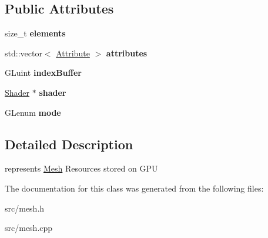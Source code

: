 \subsection*{Public Attributes}
\begin{DoxyCompactItemize}
\item 
\hypertarget{class_mesh_data_a1fe829b1f1fbc268824cbdf883a78093}{}size\+\_\+t {\bfseries elements}\label{class_mesh_data_a1fe829b1f1fbc268824cbdf883a78093}

\item 
\hypertarget{class_mesh_data_a78e8a966051cd6c5c0460074cac8fd89}{}std\+::vector$<$ \hyperlink{class_attribute}{Attribute} $>$ {\bfseries attributes}\label{class_mesh_data_a78e8a966051cd6c5c0460074cac8fd89}

\item 
\hypertarget{class_mesh_data_a99f16e148d7e476a6bfad9b8b12c9c75}{}G\+Luint {\bfseries index\+Buffer}\label{class_mesh_data_a99f16e148d7e476a6bfad9b8b12c9c75}

\item 
\hypertarget{class_mesh_data_afc5b228a665295bd97ec308367d368d4}{}\hyperlink{class_shader}{Shader} $\ast$ {\bfseries shader}\label{class_mesh_data_afc5b228a665295bd97ec308367d368d4}

\item 
\hypertarget{class_mesh_data_af210d554df28e667ca61e5afa235215b}{}G\+Lenum {\bfseries mode}\label{class_mesh_data_af210d554df28e667ca61e5afa235215b}

\end{DoxyCompactItemize}


\subsection{Detailed Description}
represents \hyperlink{class_mesh}{Mesh} Resources stored on G\+P\+U 

The documentation for this class was generated from the following files\+:\begin{DoxyCompactItemize}
\item 
src/mesh.\+h\item 
src/mesh.\+cpp\end{DoxyCompactItemize}
